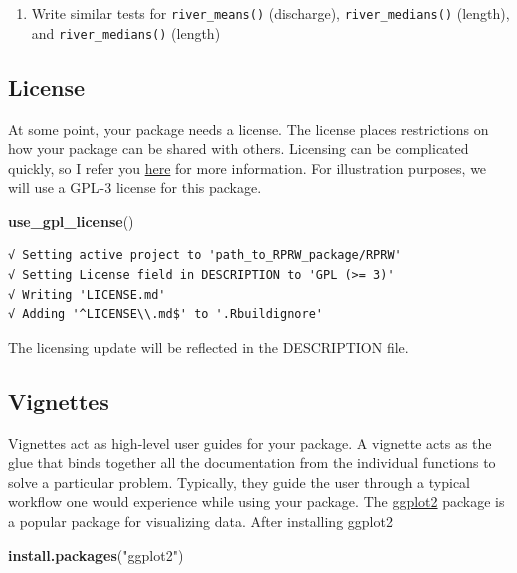 \documentclass[
]{book}
\newenvironment{Shaded}{\begin{snugshade}}{\end{snugshade}}
\newcommand{\KeywordTok}[1]{\textcolor[rgb]{0.13,0.29,0.53}{\textbf{#1}}}
\newcommand{\NormalTok}[1]{#1}
\newcommand{\StringTok}[1]{\textcolor[rgb]{0.31,0.60,0.02}{#1}}
\providecommand{\tightlist}{%
  \setlength{\itemsep}{0pt}\setlength{\parskip}{0pt}}
\begin{document}
\begin{enumerate}
\def\labelenumi{\arabic{enumi}.}
\tightlist
\item
  Write similar tests for \texttt{river\_means()} (discharge), \texttt{river\_medians()} (length), and \texttt{river\_medians()} (length)
\end{enumerate}

\hypertarget{license}{%
\subsection{License}\label{license}}

At some point, your package needs a license. The license places restrictions on how your package can be shared with others. Licensing can be complicated quickly, so I refer you \href{https://r-pkgs.org/license.html}{here} for more information. For illustration purposes, we will use a GPL-3 license for this package.

\begin{Shaded}
\begin{Highlighting}[]
\KeywordTok{use_gpl_license}\NormalTok{()}
\end{Highlighting}
\end{Shaded}

\begin{verbatim}
√ Setting active project to 'path_to_RPRW_package/RPRW'
√ Setting License field in DESCRIPTION to 'GPL (>= 3)'
√ Writing 'LICENSE.md'
√ Adding '^LICENSE\\.md$' to '.Rbuildignore'
\end{verbatim}

The licensing update will be reflected in the DESCRIPTION file.

\hypertarget{vignettes}{%
\subsection{Vignettes}\label{vignettes}}

Vignettes act as high-level user guides for your package. A vignette acts as the glue that binds together all the documentation from the individual functions to solve a particular problem. Typically, they guide the user through a typical workflow one would experience while using your package. The \href{https://ggplot2.tidyverse.org/}{ggplot2} package is a popular package for visualizing data. After installing ggplot2

\begin{Shaded}
\begin{Highlighting}[]
\KeywordTok{install.packages}\NormalTok{(}\StringTok{"ggplot2"}\NormalTok{)}
\end{Highlighting}
\end{Shaded}
\end{document}
